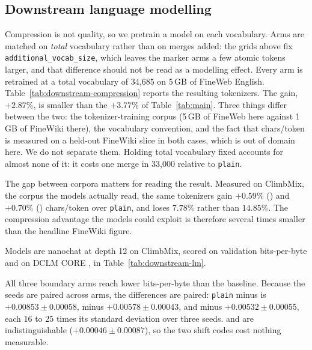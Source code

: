 %
%
\subsection{Downstream language modelling}
\label{sec:downstream}

Compression is not quality, so we pretrain a model on each vocabulary. Arms are matched on
\emph{total} vocabulary rather than on merges added: the grids above fix
\texttt{additional\_vocab\_size}, which leaves the marker arms a few atomic tokens larger, and
that difference should not be read as a modelling effect. Every arm is retrained at a total
vocabulary of 34{,}685 on 5\,GB of FineWeb English. Table~\ref{tab:downstream-compression} reports the
resulting tokenizers. The gain, $+2.87\%$, is smaller than the $+3.77\%$ of
Table~\ref{tab:main}. Three things differ between the two: the tokenizer-training corpus
(5\,GB of FineWeb here against 1\,GB of FineWiki there), the vocabulary convention, and the
fact that chars/token is measured on a held-out FineWiki slice in both cases, which is out of
domain here. We do not separate them. Holding total vocabulary fixed accounts for almost none
of it: it costs  one merge in 33{,}000 relative to \texttt{plain}.

The gap between corpora matters for reading the result. Measured on ClimbMix, the corpus the
models actually read, the same tokenizers gain $+0.59\%$ () and $+0.70\%$
() chars/token over \texttt{plain}, and  loses $7.78\%$ rather than
$14.85\%$. The compression advantage the models could exploit is therefore several times
smaller than the headline FineWiki figure.

Models are nanochat at depth 12 on ClimbMix, scored on validation bits-per-byte and on DCLM
CORE \citep{li2024datacomplm}, in Table~\ref{tab:downstream-lm}.



All three boundary arms reach lower bits-per-byte than the baseline. Because the seeds are
paired across arms, the differences are paired: \texttt{plain} minus  is
$+0.00853 \pm 0.00058$, minus  $+0.00578 \pm 0.00043$, and minus 
$+0.00532 \pm 0.00055$, each 16 to 25 times its standard deviation over three seeds.
 and  are indistinguishable ($+0.00046 \pm 0.00087$), so the two
shift codes cost nothing measurable.

